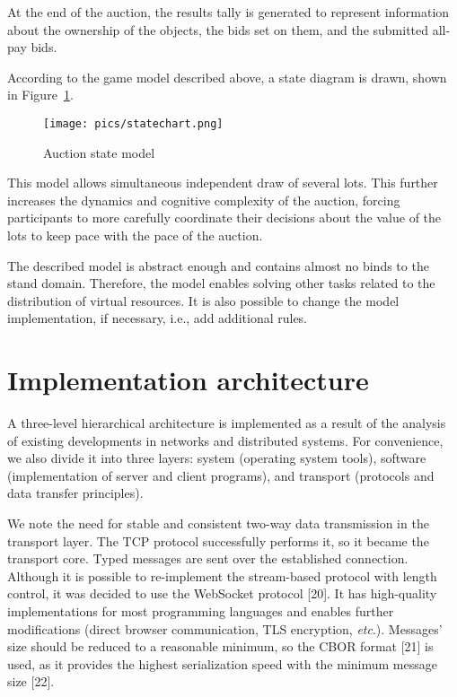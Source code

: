 \documentclass[
]{ceurart}
\begin{document}
At the end of the auction, the results tally is generated to represent information about the ownership of the objects, the bids set on them, and the submitted all-pay bids.

According to the game model described above, a state diagram is drawn, shown in Figure~\ref{fig:1}.


\begin{figure}
  \centering
  \texttt{[image: pics/statechart.png]}
  \caption{Auction state model}
  \label{fig:1}
\end{figure}

This model allows simultaneous independent draw of several lots. This further increases the dynamics and cognitive complexity of the auction, forcing participants to more carefully coordinate their decisions about the value of the lots to keep pace with the pace of the auction.

The described model is abstract enough and contains almost no binds to the stand domain. Therefore, the model enables solving other tasks related to the distribution of virtual resources. It is also possible to change the model implementation, if necessary, i.e., add additional rules.

\section{Implementation architecture}
\label{sec:impl-arch}

A three-level hierarchical architecture is implemented as a result of the analysis of existing developments in networks and distributed systems. For convenience, we also divide it into three layers: system (operating system tools), software (implementation of server and client programs), and transport (protocols and data transfer principles).

We note the need for stable and consistent two-way data transmission in the transport layer. The TCP protocol successfully performs it, so it became the transport core. Typed messages are sent over the established connection. Although it is possible to re-implement the stream-based protocol with length control, it was decided to use the WebSocket protocol [20]. It has high-quality implementations for most programming languages and enables further modifications (direct browser communication, TLS encryption, \emph{etc}.). Messages' size should be reduced to a reasonable minimum, so the CBOR format [21] is used, as it provides the highest serialization speed with the minimum message size [22].
\end{document}
